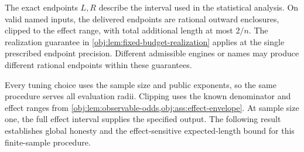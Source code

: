 The exact endpoints \(L,R\) describe the interval used in the statistical analysis. On valid named inputs, the delivered endpoints are rational outward enclosures, clipped to the effect range, with total additional length at most \(2/n\). The realization guarantee in \cref{obj:lem:fixed-budget-realization} applies at the single prescribed endpoint precision. Different admissible engines or names may produce different rational endpoints within these guarantees.

Every tuning choice uses the sample size and public exponents, so the same procedure serves all evaluation radii. Clipping uses the known denominator and effect ranges from \cref{obj:lem:observable-odds,obj:ass:effect-envelope}. At sample size one, the full effect interval supplies the specified output. The following result establishes global honesty and the effect-sensitive expected-length bound for this finite-sample procedure.

